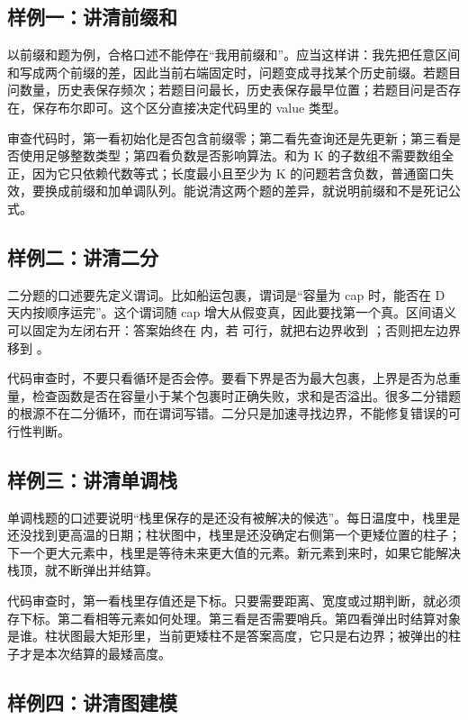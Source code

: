 \subsection{样例一：讲清前缀和}

以前缀和题为例，合格口述不能停在“我用前缀和”。应当这样讲：我先把任意区间和写成两个前缀的差，因此当前右端固定时，问题变成寻找某个历史前缀。若题目问数量，历史表保存频次；若题目问最长，历史表保存最早位置；若题目问是否存在，保存布尔即可。这个区分直接决定代码里的 value 类型。

审查代码时，第一看初始化是否包含前缀零；第二看先查询还是先更新；第三看是否使用足够整数类型；第四看负数是否影响算法。和为 K 的子数组不需要数组全正，因为它只依赖代数等式；长度最小且至少为 K 的问题若含负数，普通窗口失效，要换成前缀和加单调队列。能说清这两个题的差异，就说明前缀和不是死记公式。

\subsection{样例二：讲清二分}

二分题的口述要先定义谓词。比如船运包裹，谓词是“容量为 cap 时，能否在 D 天内按顺序运完”。这个谓词随 cap 增大从假变真，因此要找第一个真。区间语义可以固定为左闭右开：答案始终在 \code{[left,right)} 内，若  可行，就把右边界收到 ；否则把左边界移到 。

代码审查时，不要只看循环是否会停。要看下界是否为最大包裹，上界是否为总重量，检查函数是否在容量小于某个包裹时正确失败，求和是否溢出。很多二分错题的根源不在二分循环，而在谓词写错。二分只是加速寻找边界，不能修复错误的可行性判断。

\subsection{样例三：讲清单调栈}

单调栈题的口述要说明“栈里保存的是还没有被解决的候选”。每日温度中，栈里是还没找到更高温的日期；柱状图中，栈里是还没确定右侧第一个更矮位置的柱子；下一个更大元素中，栈里是等待未来更大值的元素。新元素到来时，如果它能解决栈顶，就不断弹出并结算。

代码审查时，第一看栈里存值还是下标。只要需要距离、宽度或过期判断，就必须存下标。第二看相等元素如何处理。第三看是否需要哨兵。第四看弹出时结算对象是谁。柱状图最大矩形里，当前更矮柱不是答案高度，它只是右边界；被弹出的柱子才是本次结算的最矮高度。

\subsection{样例四：讲清图建模}

